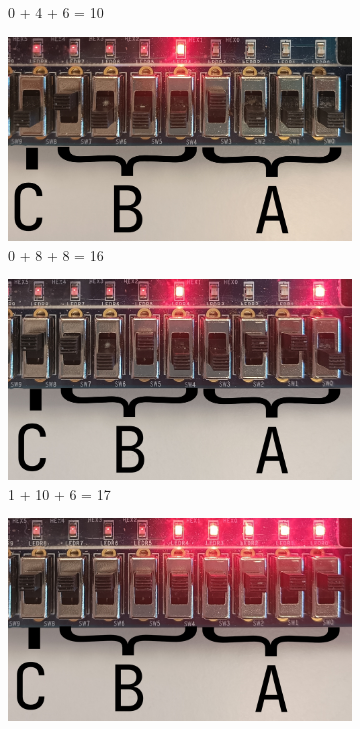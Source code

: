 \documentclass{article}
\begin{document}
\begin{figure}[h]
\begin{subfigure}{0.4\textwidth}
        \caption{0 + 4 + 6 = 10}
        \label{fig:T03pic6}
    \end{subfigure}
    \hfill
    \begin{subfigure}{0.4\textwidth}
        \centering
        \includegraphics[width=1\textwidth]{Figures/Part3-0_8_8.jpg}
        \caption{0 + 8 + 8 = 16}
        \label{fig:T03pic3}
    \end{subfigure}
    \begin{subfigure}{0.4\textwidth}
        \centering
        \includegraphics[width=1\textwidth]{Figures/Part3-1_10_6.jpg}
        \caption{1 + 10 + 6 = 17}
        \label{fig:T03pic4}
    \end{subfigure}
    \hfill
    \begin{subfigure}{0.4\textwidth}
        \centering
        \includegraphics[width=1\textwidth]{Figures/Part3-1_15_15.jpg}

\end{subfigure}
\end{figure}
\end{document}
